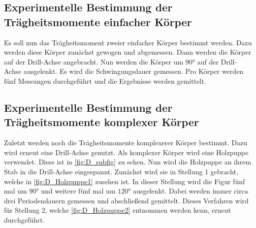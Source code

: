 \subsection{Experimentelle Bestimmung der Trägheitsmomente einfacher Körper}
\label{subsec:D_Körper}
Es soll nun das Trägheitsmoment zweier einfacher Körper bestimmt werden. Dazu werden diese Körper zunächst gewogen und abgemessen. Dann werden die Körper auf der Drill-Achse angebracht. Nun werden
die Körper um $90\unit{\degree}$ auf der Drill-Achse ausgelenkt. Es wird die Schwingungsdauer gemessen. Pro Körper werden fünf Messungen durchgeführt und die Ergebnisse werden gemittelt.
\subsection{Experimentelle Bestimmung der Trägheitsmomente komplexer Körper}
\label{subsec:D_Figur}
Zuletzt werden noch die Trägheitsmomente komplexerer Körper bestimmt. Dazu wird erneut eine Drill-Achse genutzt. Als komplexer Körper wird eine Holzpuppe verwendet. Diese ist in \autoref{fig:D_subfig} zu sehen.
Nun wird die Holzpuppe an ihrem Stab in die Drill-Achse eingespannt. Zunächst wird sie in Stellung 1 gebracht, welche in \autoref{fig:D_Holzpuppe1} zusehen ist. In dieser Stellung wird die Figur fünf 
mal um $90\unit{\degree}$ und weitere fünf mal um $120\unit{\degree}$ ausgelenkt. Dabei werden immer circa drei Periodendauern gemessen und abschließend gemittelt. Dieses Verfahren wird für 
Stellung 2, welche \autoref{fig:D_Holzpuppe2} entnommen werden kenn, erneut durchgeführt. 
